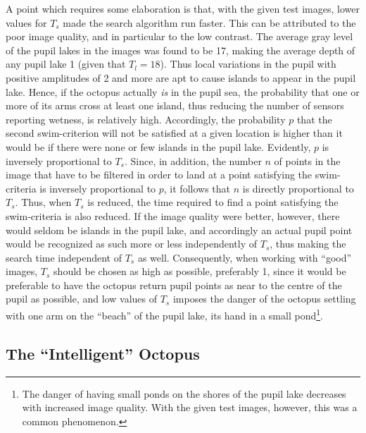 A point which requires some elaboration is that, with the given test
images, lower values for $T_{s}$ made the search algorithm run faster.
This can be attributed to the poor image quality, and in particular to
the low contrast.  The average gray level of the pupil lakes in the
images was found to be 17, making the average depth of any pupil lake
1 (given that $T_{l}=18$).  Thus local variations in the pupil with
positive amplitudes of 2 and more are apt to cause islands to appear
in the pupil lake.  Hence, if the octopus actually {\em is\/} in the
pupil sea, the probability that one or more of its arms cross at least
one island, thus reducing the number of sensors reporting wetness, is
relatively high.  Accordingly, the probability $p$ that the second
swim-criterion will not be satisfied at a given location is higher
than it would be if there were none or few islands in the pupil lake.
Evidently, $p$ is inversely proportional to $T_{s}$.  Since, in
addition, the number $n$ of points in the image that have to be
filtered in order to land at a point satisfying the swim-criteria is
inversely proportional to $p$, it follows that $n$ is directly
proportional to $T_{s}$.  Thus, when $T_{s}$ is reduced, the time
required to find a point satisfying the swim-criteria is also reduced.
If the image quality were better, however, there would seldom be
islands in the pupil lake, and accordingly an actual pupil point would
be recognized as such more or less independently of $T_{s}$, thus
making the search time independent of $T_{s}$ as well.  Consequently,
when working with ``good'' images, $T_{s}$ should be chosen as high as
possible, preferably 1, since it would be preferable to have the
octopus return pupil points as near to the centre of the pupil as
possible, and low values of $T_{s}$ imposes the danger of the octopus
settling with one arm on the ``beach'' of the pupil lake, its hand in
a small pond\footnote{The danger of having small ponds on the shores
  of the pupil lake decreases with increased image quality.  With the
  given test images, however, this was a common phenomenon.}.

\subsection{The ``Intelligent'' Octopus}
\label{algo:seek:IQ}

